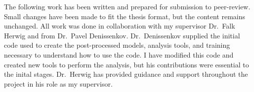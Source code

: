 \label{sec:thepaper}
\label{chapter:impact_of_3D_nuclear_pnuclei_OCmerger}

\newlength{\savedunitlength}
\setlength{\unitlength}{2em}

The following work has been written and prepared for submission to peer-review.
Small changes have been made to fit the thesis format, but the content remains unchanged.
All work was done in collaboration with my supervisor Dr.\ Falk Herwig and from Dr.\ Pavel Denissenkov.
Dr.\ Denissenkov supplied the initial code used to create the post-processed models, analysis tools, and training necessary to understand how to use the code.
I have modified this code and created new tools to perform the analysis, but his contributions were essential to the inital stages.
Dr.\ Herwig has provided guidance and support throughout the project in his role as my supervisor.





\setlength{\unitlength}{\savedunitlength}
